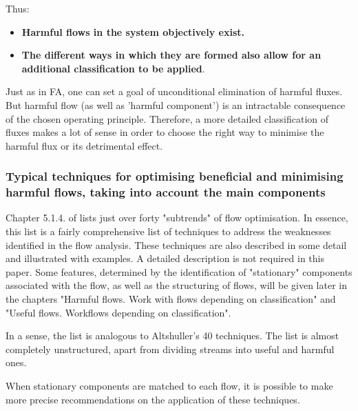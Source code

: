 \documentclass[a4paper,11pt]{article}
\begin{document}
Thus:
\begin{itemize}
\item \textbf{Harmful flows in the system objectively exist.}
\item \textbf{The different ways in which they are formed also allow for an
  additional classification to be applied}.
\end{itemize}
Just as in FA, one can set a goal of unconditional elimination of harmful
fluxes. But harmful flow (as well as 'harmful component') is an intractable
consequence of the chosen operating principle. Therefore, a more detailed
classification of fluxes makes a lot of sense in order to choose the right way
to minimise the harmful flux or its detrimental effect.

\subsubsection{Typical techniques for optimising beneficial and minimising
  harmful flows, taking into account the main components}

Chapter 5.1.4. of \cite{B6} lists just over forty "subtrends" of flow
optimisation. In essence, this list is a fairly comprehensive list of
techniques to address the weaknesses identified in the flow analysis. These
techniques are also described in some detail and illustrated with examples. A
detailed description is not required in this paper. Some features, determined
by the identification of "stationary" components associated with the flow, as
well as the structuring of flows, will be given later in the chapters "Harmful
flows. Work with flows depending on classification" and "Useful flows.
Workflows depending on classification".

In a sense, the list is analogous to Altshuller's 40 techniques. The list is
almost completely unstructured, apart from dividing streams into useful and
harmful ones.

When stationary components are matched to each flow, it is possible to make
more precise recommendations on the application of these techniques.
\end{document}
